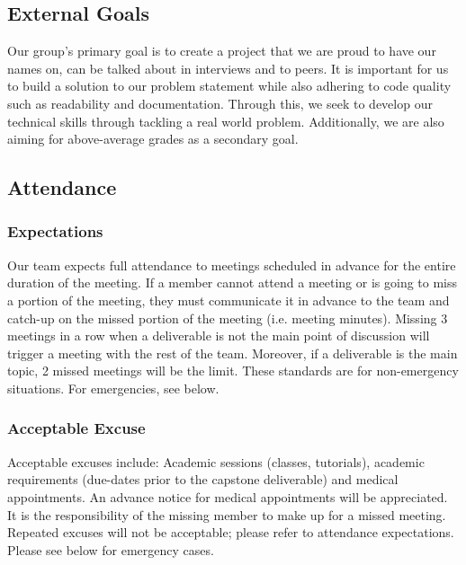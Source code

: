 \documentclass{article}
\begin{document}

\subsection*{External Goals}

Our group's primary goal is to create a project that we are proud to have our names
on, can be talked about in interviews and to peers. It is important for us to build 
a solution to our problem statement while also adhering to code quality such as 
readability and documentation. Through this, we seek to develop our technical skills 
through tackling a real world problem. Additionally, we are also aiming for above-average 
grades as a secondary goal. 

\subsection*{Attendance}

\subsubsection*{Expectations}

Our team expects full attendance to meetings scheduled in advance for the entire duration 
of the meeting. If a member cannot attend a meeting or is going to miss a portion of the meeting, 
they must communicate it in advance to the team and catch-up on the missed portion of the meeting 
(i.e. meeting minutes). Missing 3 meetings in a row when a deliverable is not the main point of 
discussion will trigger a meeting with the rest of the team. Moreover, if a deliverable is the 
main topic, 2 missed meetings will be the limit. These standards are for non-emergency situations. 
For emergencies, see below. 

\subsubsection*{Acceptable Excuse}

Acceptable excuses include: Academic sessions (classes, tutorials), academic requirements (due-dates
prior to the capstone deliverable) and medical appointments. An advance notice for medical 
appointments will be appreciated. It is the responsibility of the missing member to make up for a 
missed meeting. Repeated excuses will not be acceptable; please refer to attendance expectations. 
Please see below for emergency cases.
\end{document}

